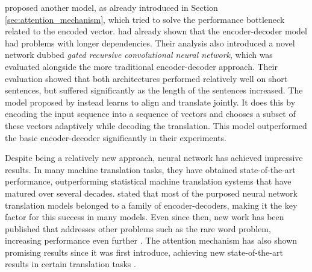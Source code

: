 \citep{bahdanau2014neural} proposed another model, as already introduced in Section \ref{sec:attention_mechanism}, which tried to solve the performance bottleneck related to the encoded vector. \citep{cho2014properties} had already shown that the encoder-decoder model had problems with longer dependencies. Their analysis also introduced a novel network dubbed \textit{gated recursive convolutional neural network}, which was evaluated alongside the more traditional encoder-decoder approach. Their evaluation showed that both architectures performed relatively well on short sentences, but suffered significantly as the length of the sentences increased. The model proposed by \citep{bahdanau2014neural} instead learns to align and translate jointly. It does this by encoding the input sequence into a sequence of vectors and chooses a subset of these vectors adaptively while decoding the translation. This model outperformed the basic encoder-decoder significantly in their experiments.

Despite being a relatively new approach, neural network has achieved impressive results. In many machine translation tasks, they have obtained state-of-the-art performance, outperforming statistical machine translation systems that have matured over several decades. \citep{bahdanau2014neural} stated that most of the purposed neural network translation models belonged to a family of encoder-decoders, making it the key factor for this success in many models. Even since then, new work has been published that addresses other problems such as the rare word problem, increasing performance even further \citep{sennrich2015neural}. The attention mechanism \citep{bahdanau2014neural} has also shown promising results since it was first introduce, achieving new state-of-the-art results in certain translation tasks \citep{luong2015effective}.